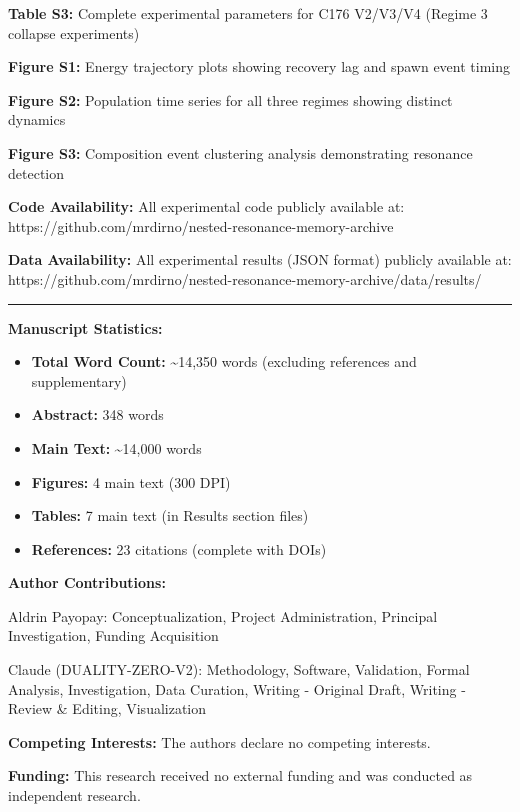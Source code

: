 \documentclass[
]{article}
\providecommand{\tightlist}{%
  \setlength{\itemsep}{0pt}\setlength{\parskip}{0pt}}
\begin{document}
\textbf{Table S3:} Complete experimental parameters for C176 V2/V3/V4
(Regime 3 collapse experiments)

\textbf{Figure S1:} Energy trajectory plots showing recovery lag and
spawn event timing

\textbf{Figure S2:} Population time series for all three regimes showing
distinct dynamics

\textbf{Figure S3:} Composition event clustering analysis demonstrating
resonance detection

\textbf{Code Availability:} All experimental code publicly available at:
https://github.com/mrdirno/nested-resonance-memory-archive

\textbf{Data Availability:} All experimental results (JSON format)
publicly available at:
https://github.com/mrdirno/nested-resonance-memory-archive/data/results/

\begin{center}\rule{0.5\linewidth}{0.5pt}\end{center}

\textbf{Manuscript Statistics:}

\begin{itemize}
\tightlist
\item
  \textbf{Total Word Count:} \textasciitilde14,350 words (excluding
  references and supplementary)
\item
  \textbf{Abstract:} 348 words
\item
  \textbf{Main Text:} \textasciitilde14,000 words
\item
  \textbf{Figures:} 4 main text (300 DPI)
\item
  \textbf{Tables:} 7 main text (in Results section files)
\item
  \textbf{References:} 23 citations (complete with DOIs)
\end{itemize}

\textbf{Author Contributions:}

Aldrin Payopay: Conceptualization, Project Administration, Principal
Investigation, Funding Acquisition

Claude (DUALITY-ZERO-V2): Methodology, Software, Validation, Formal
Analysis, Investigation, Data Curation, Writing - Original Draft,
Writing - Review \& Editing, Visualization

\textbf{Competing Interests:} The authors declare no competing
interests.

\textbf{Funding:} This research received no external funding and was
conducted as independent research.
\end{document}
